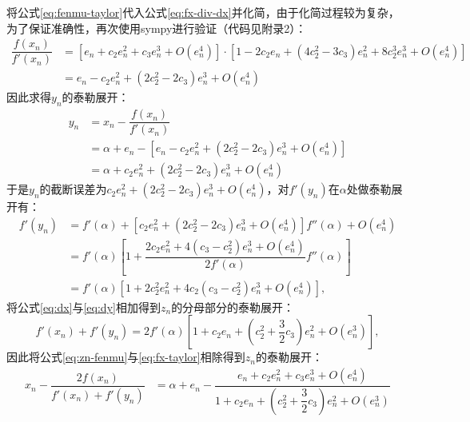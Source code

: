 将公式\ref{eq:fenmu-taylor}代入公式\ref{eq:fx-div-dx}并化简，由于化简过程较为复杂，为了保证准确性，再次使用sympy进行验证（代码见附录2）：
\begin{equation}
    \begin{aligned}
        \dfrac{f(x_n)}{f'(x_n)} &= [e_n+c_2e_n^2 + c_3e_n^3 + O(e_n^4)]\cdot[1 - 2c_2e_n + (4c_2^2 - 3c_3)e_n^2 + 8c_2^3e_n^3 + O(e_n^4)] \\
        &= e_n - c_2e_n^2 + (2c_2^2 - 2c_3)e_n^3 + O(e_n^4)
    \end{aligned}
\end{equation}
因此求得$y_n$的泰勒展开：
\begin{equation}
    \begin{aligned}
        y_n &= x_n - \dfrac{f(x_n)}{f'(x_n)}\\
        &= \alpha + e_n - [e_n - c_2e_n^2 + (2c_2^2 - 2c_3)e_n^3 + O(e_n^4)] \\
        &= \alpha + c_2e_n^2 + (2c_2^2 - 2c_3)e_n^3 + O(e_n^4)
    \end{aligned}
\end{equation}
于是$y_n$的截断误差为$c_2e_n^2 + (2c_2^2 - 2c_3)e_n^3 + O(e_n^4)$，对$f'(y_n)$在$\alpha$处做泰勒展开有：
\begin{equation}
    \label{eq:dy}
    \begin{aligned}
        f'(y_n) &= f'(\alpha) + [c_2e_n^2 + (2c_2^2 - 2c_3)e_n^3 + O(e_n^4)]f''(\alpha) + O(e_n^4) \\
        &= f'(\alpha)\left[ 1 + \dfrac{2c_2e_n^2 + 4(c_3 - c_2^2)e_n^3 + O(e_n^4)}{2f'(\alpha)}f''(\alpha) \right] \\
        &= f'(\alpha)[1 + 2c_2^2e_n^2 + 4c_2(c_3 - c_2^2)e_n^3 + O(e_n^4)],
    \end{aligned}
\end{equation}
将公式\ref{eq:dx}与\ref{eq:dy}相加得到$z_n$的分母部分的泰勒展开：
\begin{equation}
    \label{eq:zn-fenmu}
    f'(x_n) + f'(y_n) = 2f'(\alpha)\left[ 1 + c_2e_n + \left( c_2^2 + \dfrac{3}{2}c_3 \right)e_n^2 + O(e_n^3) \right],
\end{equation}
因此将公式\ref{eq:zn-fenmu}与\ref{eq:fx-taylor}相除得到$z_n$的泰勒展开：
\begin{equation}
    \begin{aligned}
        x_n - \dfrac{2f(x_n)}{f'(x_n) + f'(y_n)} &= \alpha + e_n - \dfrac{e_n + c_2e_n^2 + c_3e_n^3 + O(e_n^4)}{1 + c_2e_n+ \left(c_2^2 + \dfrac{3}{2}c_3  \right)e_n^2 + O(e_n^3)}
    \end{aligned}
\end{equation}
